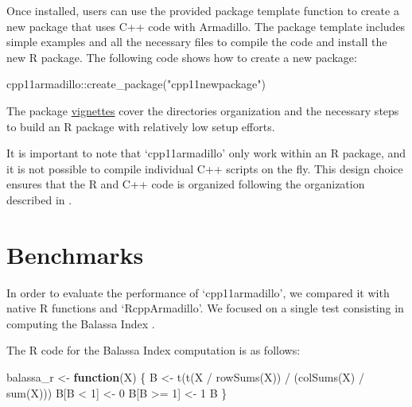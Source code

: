\documentclass[
  10pt,
  letterpaper,
]{article}
\newenvironment{Shaded}{\begin{snugshade}}{\end{snugshade}}
\newcommand{\ControlFlowTok}[1]{\textcolor[rgb]{0.00,0.23,0.31}{\textbf{#1}}}
\newcommand{\DecValTok}[1]{\textcolor[rgb]{0.68,0.00,0.00}{#1}}
\newcommand{\FunctionTok}[1]{\textcolor[rgb]{0.28,0.35,0.67}{#1}}
\newcommand{\NormalTok}[1]{\textcolor[rgb]{0.00,0.23,0.31}{#1}}
\newcommand{\OtherTok}[1]{\textcolor[rgb]{0.00,0.23,0.31}{#1}}
\newcommand{\SpecialCharTok}[1]{\textcolor[rgb]{0.37,0.37,0.37}{#1}}
\newcommand{\StringTok}[1]{\textcolor[rgb]{0.13,0.47,0.30}{#1}}
\begin{document}
Once installed, users can use the provided package template function to
create a new package that uses C++ code with Armadillo. The package
template includes simple examples and all the necessary files to compile
the code and install the new R package. The following code shows how to
create a new package:

\begin{Shaded}
\begin{Highlighting}[]
\NormalTok{cpp11armadillo}\SpecialCharTok{::}\FunctionTok{create\_package}\NormalTok{(}\StringTok{"cpp11newpackage"}\NormalTok{)}
\end{Highlighting}
\end{Shaded}

The package
\href{https://pacha.dev/cpp11armadillo/index.html}{vignettes} cover the
directories organization and the necessary steps to build an R package
with relatively low setup efforts.

It is important to note that `cpp11armadillo' only work within an R
package, and it is not possible to compile individual C++ scripts on the
fly. This design choice ensures that the R and C++ code is organized
following the organization described in \citet{wickham2023}.

\section{Benchmarks}\label{benchmarks}

In order to evaluate the performance of `cpp11armadillo', we compared it
with native R functions and `RcppArmadillo'. We focused on a single test
consisting in computing the Balassa Index \citep{vargassepulveda2020}.

The R code for the Balassa Index computation is as follows:

\begin{Shaded}
\begin{Highlighting}[]
\NormalTok{balassa\_r }\OtherTok{\textless{}{-}} \ControlFlowTok{function}\NormalTok{(X) \{}
\NormalTok{  B }\OtherTok{\textless{}{-}} \FunctionTok{t}\NormalTok{(}\FunctionTok{t}\NormalTok{(X }\SpecialCharTok{/} \FunctionTok{rowSums}\NormalTok{(X)) }\SpecialCharTok{/}\NormalTok{ (}\FunctionTok{colSums}\NormalTok{(X) }\SpecialCharTok{/} \FunctionTok{sum}\NormalTok{(X)))}
\NormalTok{  B[B }\SpecialCharTok{\textless{}} \DecValTok{1}\NormalTok{] }\OtherTok{\textless{}{-}} \DecValTok{0}
\NormalTok{  B[B }\SpecialCharTok{\textgreater{}=} \DecValTok{1}\NormalTok{] }\OtherTok{\textless{}{-}} \DecValTok{1}
\NormalTok{  B}
\NormalTok{\}}
\end{Highlighting}
\end{Shaded}
\end{document}
